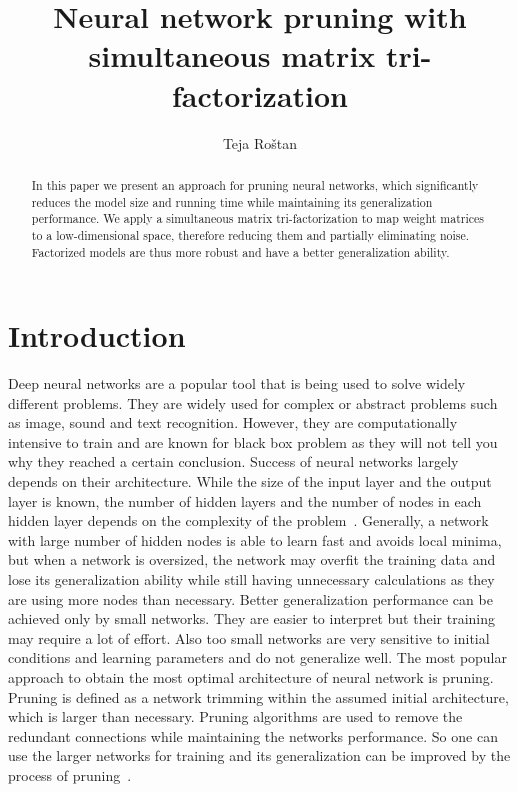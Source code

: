 \documentclass{article} %
\title{Neural network pruning with simultaneous matrix tri-factorization}
\author{Teja Ro\v{s}tan}
\begin{document}
\maketitle

\begin{abstract}

In this paper we present an approach for pruning neural networks, which
significantly reduces the model size and running time while maintaining its 
generalization performance. We apply a simultaneous matrix tri-factorization 
to map weight matrices to a low-dimensional space, therefore reducing them 
and partially eliminating noise. Factorized models are thus more robust and 
have a better generalization ability.

\end{abstract}

\section{Introduction}

Deep neural networks are a popular tool that is being used to solve widely
different problems. They are widely used for complex or abstract problems 
such as image,
sound and text recognition. However, they are computationally intensive to
train and are known for black box problem as they will not tell you why they
reached a certain conclusion. Success of neural networks largely depends on
their architecture. While the size of the input layer and the output layer is
known, the number of hidden layers and the number of nodes in each hidden layer
depends on the complexity of the problem~\cite{augasta2013pruning}. Generally,
a network with large number of hidden nodes is able to learn fast and avoids
local minima, but when a network is oversized, the network may overfit the
training data and lose its generalization ability while still having
unnecessary calculations as they are using more nodes than necessary. Better
generalization performance can be achieved only by small networks. They are
easier to interpret but their training may require a lot of effort. Also too
small networks are very sensitive to initial conditions and learning parameters
and do not generalize well. The most popular approach to
obtain the most optimal architecture of neural network is pruning. Pruning is
defined as a network trimming within the assumed initial architecture, which is
larger than necessary. Pruning algorithms are used to remove the redundant
connections while maintaining the networks performance. So one can use the
larger networks for training and its generalization can be improved by the
process of pruning~\cite{augasta2013pruning}.
\end{document}
